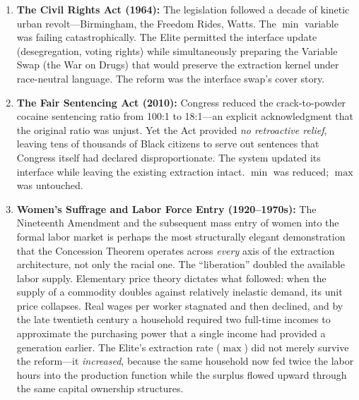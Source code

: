 \documentclass[12pt,openany]{book}
\begin{document}
\begin{enumerate}
    The theorem's temporal prediction was also confirmed: once the kinetic threat of the Depression era subsided, the material wage was gradually clawed back. By 2020, wealth concentration had returned to 1920s Gilded Age levels. The kernel recompiled.

    \item \textbf{The Civil Rights Act (1964):} The legislation followed a decade of kinetic urban revolt---Birmingham, the Freedom Rides, Watts. The $\min$ variable was failing catastrophically. The Elite permitted the interface update (desegregation, voting rights) while simultaneously preparing the Variable Swap (the War on Drugs) that would preserve the extraction kernel under race-neutral language. The reform was the interface swap's cover story.

    \item \textbf{The Fair Sentencing Act (2010):} Congress reduced the crack-to-powder cocaine sentencing ratio from 100:1 to 18:1---an explicit acknowledgment that the original ratio was unjust. Yet the Act provided \textit{no retroactive relief}, leaving tens of thousands of Black citizens to serve out sentences that Congress itself had declared disproportionate. The system updated its interface while leaving the existing extraction intact. $\min$ was reduced; $\max$ was untouched.

    \item \textbf{Women's Suffrage and Labor Force Entry (1920--1970s):} The Nineteenth Amendment and the subsequent mass entry of women into the formal labor market is perhaps the most structurally elegant demonstration that the Concession Theorem operates across \textit{every} axis of the extraction architecture, not only the racial one. The ``liberation'' doubled the available labor supply. Elementary price theory dictates what followed: when the supply of a commodity doubles against relatively inelastic demand, its unit price collapses. Real wages per worker stagnated and then declined, and by the late twentieth century a household required two full-time incomes to approximate the purchasing power that a single income had provided a generation earlier. The Elite's extraction rate ($\max$) did not merely survive the reform---it \textit{increased}, because the same household now fed twice the labor hours into the production function while the surplus flowed upward through the same capital ownership structures.


\end{enumerate}
\end{document}
